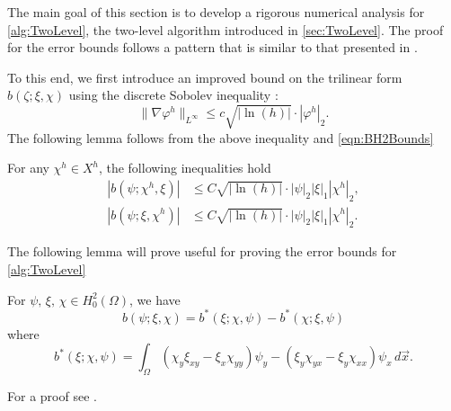 The main goal of this section is to develop a rigorous numerical analysis for
\autoref{alg:TwoLevel}, the two-level algorithm introduced in
\autoref{sec:TwoLevel}. The proof for the error bounds follows a pattern that is
similar to that presented in \cite{Fairag98}.

To this end, we first introduce an improved bound on the trilinear form
$b(\zeta; \xi, \chi)$ using the discrete Sobolev inequality
\cite{Ciarlet,Fairag98}:
\begin{equation*}
  \|\nabla \varphi^h\|_{L^{\infty}} \le c \sqrt{|\ln(h)|}\cdot |\varphi^h|_2.
\end{equation*}
The following lemma follows from the above inequality and \eqref{eqn:BH2Bounds} %
\begin{lemma} \label{lma:bImproved}
  For any $\chi^h\in X^h$, the following inequalities hold
  \begin{align*}
    |b(\psi;\chi^h,\xi)| &\le C\sqrt{|\ln(h)|} \cdot |\psi|_2 |\xi|_1 |\chi^h|_2, \\
    |b(\psi;\xi,\chi^h)| &\le C\sqrt{|\ln(h)|} \cdot |\psi|_2 |\xi|_1 |\chi^h|_2.
  \end{align*}
\end{lemma}
The following lemma will prove useful for proving the error bounds for
\autoref{alg:TwoLevel}
\begin{lemma} \label{lma:trilinear}
  For $\psi,\,\xi,\,\chi\in H^2_0(\Omega)$, we have
  \begin{equation}
    b(\psi; \xi, \chi) = b^*(\xi; \chi, \psi) - b^*(\chi; \xi, \psi)
    \label{eqn:eqn:trilinear}
  \end{equation}
  where
  \begin{equation}
    b^*(\xi; \chi, \psi) = \int_{\Omega}\! (\chi_y\xi_{xy}-\xi_x\chi_{yy}) \psi_y -
    (\xi_y\chi_{yx}-\xi_y\chi_{xx}) \psi_x \,d\vec{x}.
    \label{eqn:trilinear}
  \end{equation}
\end{lemma}
For a proof see \cite{Fairag98}.

